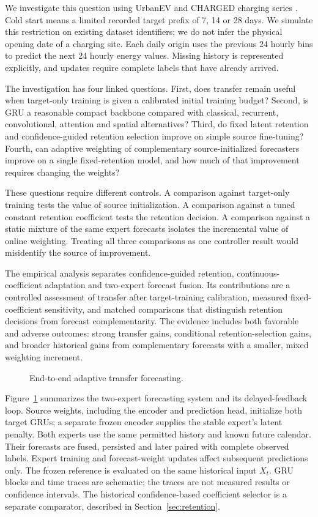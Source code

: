 \documentclass[pdflatex,iicol,sn-mathphys-num]{sn-jnl}
\begin{document}
We investigate this question using UrbanEV and CHARGED charging series \cite{urbanev2025,charged2025}. Cold start means a limited recorded target prefix of 7, 14 or 28 days. We simulate this restriction on existing dataset identifiers; we do not infer the physical opening date of a charging site. Each daily origin uses the previous 24 hourly bins to predict the next 24 hourly energy values. Missing history is represented explicitly, and updates require complete labels that have already arrived.

The investigation has four linked questions. First, does transfer remain useful when target-only training is given a calibrated initial training budget? Second, is GRU a reasonable compact backbone compared with classical, recurrent, convolutional, attention and spatial alternatives? Third, do fixed latent retention and confidence-guided retention selection improve on simple source fine-tuning? Fourth, can adaptive weighting of complementary source-initialized forecasters improve on a single fixed-retention model, and how much of that improvement requires changing the weights?

These questions require different controls. A comparison against target-only training tests the value of source initialization. A comparison against a tuned constant retention coefficient tests the retention decision. A comparison against a static mixture of the same expert forecasts isolates the incremental value of online weighting. Treating all three comparisons as one controller result would misidentify the source of improvement.

The empirical analysis separates confidence-guided retention, continuous-coefficient adaptation and two-expert forecast fusion. Its contributions are a controlled assessment of transfer after target-training calibration, measured fixed-coefficient sensitivity, and matched comparisons that distinguish retention decisions from forecast complementarity. The evidence includes both favorable and adverse outcomes: strong transfer gains, conditional retention-selection gains, and broader historical gains from complementary forecasts with a smaller, mixed weighting increment.

\begin{figure}[t]
\centering\resizebox{\textwidth}{!}{}
\caption{End-to-end adaptive transfer forecasting.}\label{fig:model}
\end{figure}
Figure~\ref{fig:model} summarizes the two-expert forecasting system and its delayed-feedback loop. Source weights, including the encoder and prediction head, initialize both target GRUs; a separate frozen encoder supplies the stable expert's latent penalty. Both experts use the same permitted history and known future calendar. Their forecasts are fused, persisted and later paired with complete observed labels. Expert training and forecast-weight updates affect subsequent predictions only. The frozen reference is evaluated on the same historical input $X_t$. GRU blocks and time traces are schematic; the traces are not measured results or confidence intervals. The historical confidence-based coefficient selector is a separate comparator, described in Section~\ref{sec:retention}.
\end{document}
